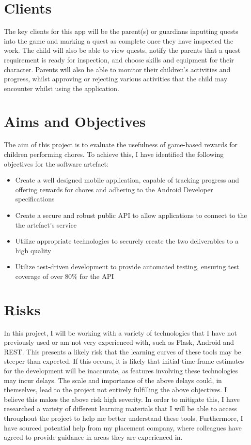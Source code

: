 \section{Clients}
The key clients for this app will be the parent(s) or guardians inputting quests into the game and marking a quest as complete once they have inspected the work. 
The child will also be able to view quests, notify the parents that a quest requirement is ready for inspection, and choose skills and equipment for their character.
Parents will also be able to monitor their children's activities and progress, whilst approving or rejecting various activities that the child may encounter whilst using the application. 

\section{Aims and Objectives}
The aim of this project is to evaluate the usefulness of game-based rewards for children performing chores. 
To achieve this, I have identified the following objectives for the software artefact:

\begin{itemize}
	\item Create a well designed mobile application, capable of tracking progress and offering rewards for chores and adhering to the Android Developer specifications
	\item Create a secure and robust public API to allow applications to connect to the the artefact's service
	\item Utilize appropriate technologies to securely create the two deliverables to a high quality
	\item Utilize test-driven development to provide automated testing, ensuring test coverage of over 80\% for the API
\end{itemize}

\section{Risks}
In this project, I will be working with a variety of technologies that I have not previously used or am not very experienced with, such as Flask, Android and REST. 
This presents a likely risk that the learning curves of these tools may be steeper than expected.
If this occurs, it is likely that initial time-frame estimates for the development will be inaccurate, as features involving these technologies may incur delays.
The scale and importance of the above delays could, in themselves, lead to the project not entirely fulfilling the above objectives. I believe this makes the above risk high severity.
In order to mitigate this, I have researched a variety of different learning materials that I will be able to access throughout the project to help me better understand these tools.
Furthermore, I have sourced potential help from my placement company, where colleagues have agreed to provide guidance in areas they are experienced in.

